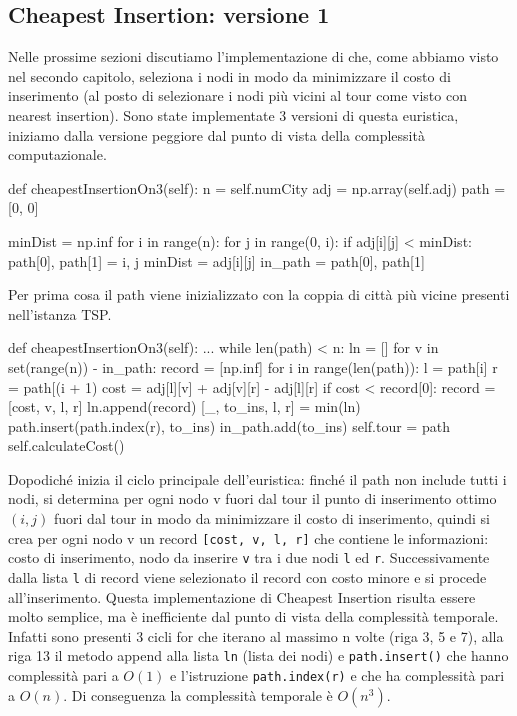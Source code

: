 \documentclass[a4paper,12pt]{report}
\begin{document}
\subsection{Cheapest Insertion: versione 1}
Nelle prossime sezioni discutiamo l'implementazione di  che, come abbiamo visto nel secondo capitolo, seleziona i nodi in modo da minimizzare il costo di inserimento (al posto di selezionare i nodi più vicini al tour come visto con nearest insertion). Sono state implementate 3 versioni di questa euristica, iniziamo dalla versione peggiore dal punto di vista della complessità computazionale.
\begin{python}
def cheapestInsertionOn3(self):
  n = self.numCity
  adj = np.array(self.adj)
  path = [0, 0]

  minDist = np.inf
  for i in range(n):
    for j in range(0, i):
      if adj[i][j] < minDist:
        path[0], path[1] = i, j
        minDist = adj[i][j]
  in_path = {path[0], path[1]}
\end{python}
Per prima cosa il path viene inizializzato con la coppia di città più vicine presenti nell'istanza TSP.
\begin{python}
def cheapestInsertionOn3(self):
  ...
  while len(path) < n:
    ln = []
    for v in set(range(n)) - in_path:
      record = [np.inf]
      for i in range(len(path)):
        l = path[i]
        r = path[(i + 1) %
        cost = adj[l][v] + adj[v][r] - adj[l][r]
        if cost < record[0]:
          record = [cost, v, l, r]
      ln.append(record)
    [_, to_ins, l, r] = min(ln)
    path.insert(path.index(r), to_ins)
    in_path.add(to_ins)                
  self.tour = path
  self.calculateCost()
\end{python}
Dopodiché inizia il ciclo principale dell'euristica: finché il path non include tutti i nodi, si determina per ogni nodo v fuori dal tour il punto di inserimento ottimo $(i, j)$ fuori dal tour in modo da minimizzare il costo di inserimento, quindi si crea per ogni nodo v un record \lstinline![cost, v, l, r]! che contiene le informazioni: costo di inserimento, nodo da inserire \lstinline!v! tra i due nodi \lstinline!l! ed \lstinline!r!. Successivamente dalla lista \lstinline!l! di record viene selezionato il record con costo minore e si procede all'inserimento. \newline
Questa implementazione di Cheapest Insertion risulta essere molto semplice, ma è inefficiente dal punto di vista della complessità temporale. Infatti sono presenti 3 cicli for che iterano al massimo n volte (riga 3, 5 e 7), alla riga 13 il metodo append alla lista \lstinline!ln! (lista dei nodi) e \lstinline!path.insert()! che hanno complessità pari a $O(1)$ e l'istruzione \lstinline!path.index(r)! e che ha complessità pari a $O(n)$. Di conseguenza la complessità temporale è $O(n^3)$.\newline
\end{document}
